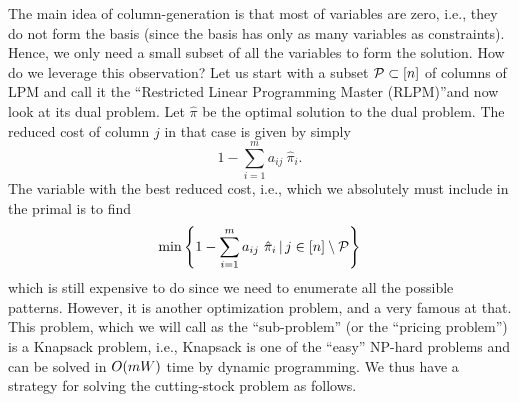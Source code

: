 \documentclass[letterpaper, 10pt, twocolumn, reqno]{amsart}
\begin{document}
The main idea of column-generation is that most of variables are zero, i.e., they do not form the basis (since the basis has only as many variables as constraints). Hence, we only need a small subset of all the variables to form the solution. How do we leverage this observation? Let us start with a subset $\mathcal{P} \subset [n]$ of columns of LPM and call it the ``Restricted Linear Programming Master (RLPM)''and now look at its dual problem.
Let $\hat{\pi}$ be the optimal solution to the dual problem. The reduced cost of column $j$ in that case is given by simply
$$
1  - \sum_{i=1}^m a_{ij}\ \hat{\pi}_i.
$$
The variable with the best reduced cost, i.e., which we absolutely must include in the primal is to find
$$
\min \left\{1  - \sum_{i=1}^m a_{ij}\ \hat{\pi}_i \, \vert \, j \in [n] \setminus \mathcal{P}\right\}
$$
which is still expensive to do since we need to enumerate all the possible patterns. However, it is another optimization problem, and a very famous at that. This problem, which we will call as the ``sub-problem'' (or the ``pricing problem'') is a Knapsack problem, i.e.,
Knapsack is one of the ``easy'' NP-hard problems and can be solved in $O(mW)$ time by dynamic programming. We thus have a strategy for solving the cutting-stock problem as follows.
\end{document}
